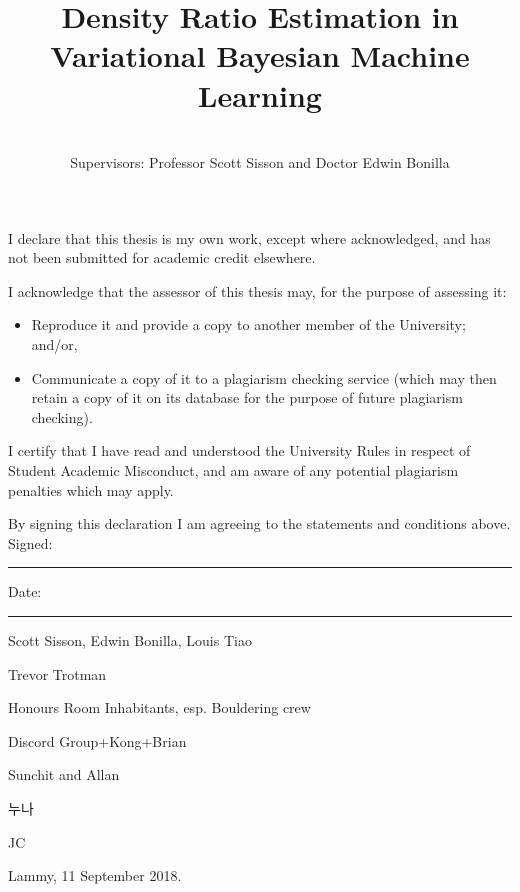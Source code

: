 \documentclass[honours,12pt]{unswthesis}
\title{Density Ratio Estimation in Variational Bayesian Machine Learning}
\author{\Authornameonly\\{\bigskip}Supervisors: Professor Scott Sisson and Doctor Edwin Bonilla}
\newcommand\blankpage{%
    \null
    \thispagestyle{empty}%
    \addtocounter{page}{-1}%
    \newpage}
\numberwithin{equation}{section}
\theoremstyle{definition}
\begin{document}
\beforepreface

\afterpage{\blankpage}



\vskip 10pc \noindent I declare that this thesis is my
own work, except where acknowledged, and has not been submitted for
academic credit elsewhere. 

\vskip 2pc  \noindent I acknowledge that the assessor of this
thesis may, for the purpose of assessing it:
\begin{itemize}
\item Reproduce it and provide a copy to another member of the University; and/or,
\item Communicate a copy of it to a plagiarism checking service (which may then retain a copy of it on its database for the purpose of future plagiarism checking).
\end{itemize}

\vskip 2pc \noindent I certify that I have read and understood the University Rules in
respect of Student Academic Misconduct, and am aware of any potential plagiarism penalties which may 
apply.\vspace{24pt}

\vskip 2pc \noindent By signing 
this declaration I am
agreeing to the statements and conditions above.
\vskip 2pc \noindent
Signed: \rule{7cm}{0.25pt} \hfill Date: \rule{4cm}{0.25pt} \newline
\vskip 1pc

\afterpage{\blankpage}




{\bigskip}Scott Sisson, Edwin Bonilla, Louis Tiao

{\bigskip\noindent}Trevor Trotman

{\bigskip\noindent}Honours Room Inhabitants, esp. Bouldering crew

{\bigskip\noindent}Discord Group+Kong+Brian

{\bigskip\noindent}Sunchit and Allan

{\bigskip\noindent}누나

{\bigskip\noindent}JC

{\bigskip\bigskip\bigskip\noindent} Lammy, 11 September 2018.

\afterpage{\blankpage}

\end{document}
